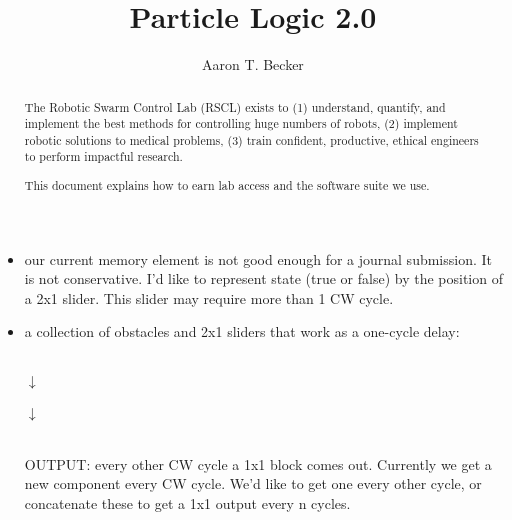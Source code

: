 \documentclass[letterpaper, 10 pt, conference]{ieeeconf}
\begin{document}
\author{Aaron T. Becker}
\title{Particle Logic 2.0}
\maketitle

\begin{abstract}
The Robotic Swarm Control Lab (RSCL) exists to
 (1) understand, quantify, and implement the best methods for controlling huge numbers of robots, 
 (2)  implement robotic solutions to medical problems, 
 (3)  train confident, productive, ethical engineers to perform impactful research.

This document explains how to earn lab access and the software suite we use.
\end{abstract}


\begin{itemize}
\item our current memory element is not good enough for a journal submission. It is not conservative.  I'd like to represent state (true or false) by the position of a 2x1 slider.  This slider may require more than 1 CW cycle.

\item a collection of obstacles and 2x1 sliders that work as a one-cycle delay:\\

\begin{centering}
 \\
$\downarrow$\\ 
\\
$\downarrow$\\ 
   \\
\end{centering}
   
OUTPUT:  every other CW cycle a 1x1 block comes out.  Currently we get a new component every CW cycle.  We'd like to get one every other cycle, or concatenate these to get a 1x1 output every n cycles.


\end{itemize}
\end{document}
